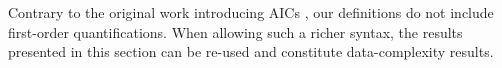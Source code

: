 

Contrary to the original work introducing AICs \cite{ppdp/FlescaGZ04}, our definitions do not include first-order quantifications. 
When allowing such a richer syntax, the results presented in this section can be re-used and constitute data-complexity results. 








